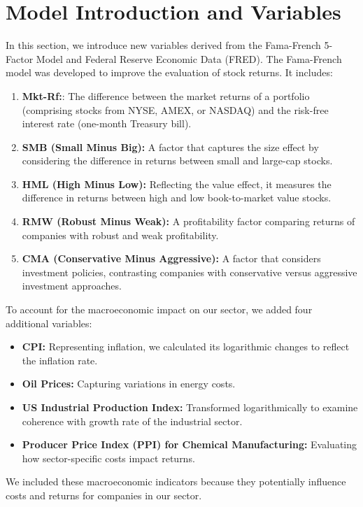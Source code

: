 \section{Model Introduction and Variables}

In this section, we introduce new variables derived from the Fama-French 5-Factor Model and Federal Reserve Economic Data 
(FRED). 
The Fama-French model was developed to improve the evaluation of stock returns.
 It includes:
\begin{enumerate}
    \item \textbf{Mkt-Rf:}: The difference between the market returns of a portfolio (comprising stocks from NYSE, AMEX, or
    NASDAQ) and the risk-free interest rate (one-month Treasury bill).
    \item \textbf{SMB (Small Minus Big):} A factor that captures the size effect by considering the difference in returns
    between small and large-cap stocks.
    \item \textbf{HML (High Minus Low):} Reflecting the value effect, it measures the difference in returns between high and
    low book-to-market value stocks.
    \item \textbf{RMW (Robust Minus Weak):} A profitability factor comparing returns of companies with robust and weak 
    profitability.
    \item \textbf{CMA (Conservative Minus Aggressive):} A factor that considers investment policies, contrasting companies 
    with conservative versus aggressive investment approaches.
\end{enumerate}

To account for the macroeconomic impact on our sector, we added four additional variables:
\begin{itemize}
    \item \textbf{CPI:} Representing inflation, we calculated its logarithmic changes to reflect the inflation rate.
    \item \textbf{Oil Prices:} Capturing variations in energy costs.
    \item \textbf{US Industrial Production Index:} Transformed logarithmically to examine coherence with growth rate of the
    industrial sector.
    \item \textbf{Producer Price Index (PPI) for Chemical Manufacturing:} Evaluating how sector-specific costs impact returns.
\end{itemize}
We included these macroeconomic indicators because they potentially influence costs and returns for companies in our sector.

